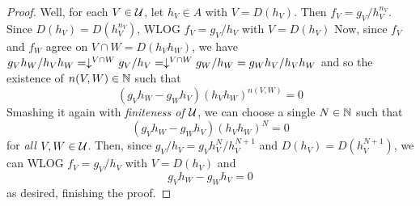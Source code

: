 \documentclass[../main.tex]{subfiles}
\begin{document}
\begin{proof}
  Well, for each $V \in \mathcal{U}$, let $h_V \in A$ with $V = D(h_V)$.
  Then $f_V = g_V / h_V^{n_V}$.
  Since $D(h_V) = D(h_V^{n_V})$, WLOG $f_V = g_V / h_V$ with $V = D(h_V)$
  Now, since $f_V$ and $f_W$ agree on $V \cap W = D(h_V h_W)$,
  we have $g_V h_W / h_V h_W = \downarrow_{}^{V\cap W} g_V / h_V
  = \downarrow_{}^{V \cap W} g_W / h_W = g_W h_V / h_V h_W$
  and so the existence of $n(V,W) \in \mathbb{N}$ such that
  \[
    (g_V h_W - g_W h_V) (h_V h_W)^{n(V,W)} = 0
  \]
  Smashing it again with \emph{finiteness of $\mathcal{U}$},
  we can choose a single $N \in \mathbb{N}$ such that 
  \[
    (g_V h_W - g_W h_V) (h_V h_W)^N = 0
  \]
  for \emph{all} $V, W \in \mathcal{U}$.
  Then, since $g_V / h_V = g_V h_V^{N} / h_V^{N+1} $
  and $D(h_V) = D(h_V^{N+1})$,
  we can WLOG $f_V = g_V / h_V$ with $V = D(h_V)$ and \[
    g_V h_W - g_W h_V = 0
  \]
  as desired, finishing the proof.


\end{proof}
\end{document}
